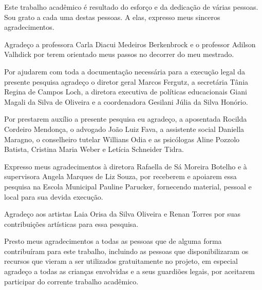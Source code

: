 \begin{agradecimentos}

    
\vspace{8pt}
Este trabalho acadêmico é resultado do esforço e da dedicação de várias pessoas. Sou grato a cada uma destas pessoas. A elas, expresso meus sinceros agradecimentos. 

\vspace{8pt}
Agradeço a professora Carla Diacui Medeiros Berkenbrock e o professor Adilson Valhdick por terem orientado meus passos no decorrer do meu mestrado.

\vspace{8pt}

Por ajudarem com toda a documentação necessária para a execução legal da presente pesquisa agradeço o diretor geral Marcos Fergutz, a secretária Tânia Regina de Campos Loch, a diretora executiva de políticas educacionais Giani Magali da Silva de Oliveira e a coordenadora Gesilani Júlia da Silva Honório.  

\vspace{8pt}
Por prestarem auxílio a presente pesquisa eu agradeço, a aposentada Rocilda Cordeiro Mendonça, o advogado João Luiz Fava, a assistente social Daniella Maragno, o conselheiro tutelar Willians Odia e as psicólogas Aline Pozzolo Batista, Cristina Maria Weber e Letícia Schneider Tidra. %

\vspace{8pt}
Expresso meus agradecimentos à diretora Rafaella de Sá Moreira Botelho e à supervisora Angela Marques de Liz Souza, por receberem e apoiarem essa pesquisa na Escola Municipal Pauline Parucker, fornecendo material, pessoal e local para sua devida execução.

\vspace{8pt}
Agradeço aos artistas Laia Orisa da Silva Oliveira e Renan Torres por suas contribuições artísticas para essa pesquisa. 

\vspace{8pt}
Presto meus agradecimentos a todas as pessoas que de alguma forma contribuíram para este trabalho, incluindo as pessoas que disponibilizaram os recursos que vieram a ser utilizados gratuitamente no projeto, em especial agradeço a todas as crianças envolvidas e a seus guardiões legais, por aceitarem participar do corrente trabalho acadêmico. %


\end{agradecimentos}

